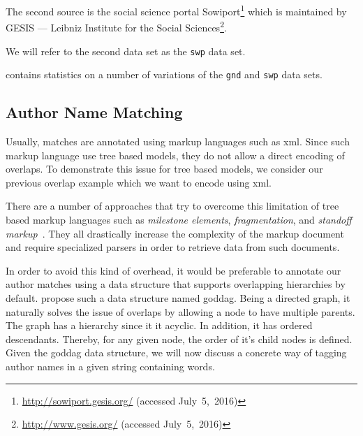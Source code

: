 \bigskip

The second source is the social science portal Sowiport\footnote{\url{http://sowiport.gesis.org/} (accessed July~5,~2016)} which is maintained by GESIS --- Leibniz Institute for the Social Sciences\footnote{\url{http://www.gesis.org/} (accessed July~5,~2016)}.

We will refer to the second data set as the \texttt{swp} data set.

\bigskip

 contains statistics on a number of variations of the \texttt{gnd} and  \texttt{swp} data sets.


\subsection{Author Name Matching}\label{subsec:i-author-name-matching}
Usually, matches are annotated using markup languages such as \gls{xml}.
Since such markup language use tree based models, they do not allow a direct encoding of overlaps.
To demonstrate this issue for tree based models, we consider our previous overlap example which we want to encode using \gls{xml}\@{}.

There are a number of approaches that try to overcome this limitation of tree based markup languages such as \textit{milestone elements}, \textit{fragmentation}, and \textit{standoff markup}~\citep{sperberg2000goddag}. They all drastically increase the complexity of the markup document and require specialized parsers in order to retrieve data from such documents.

In order to avoid this kind of overhead, it would be preferable to annotate our author matches using a data structure that supports overlapping hierarchies by default.
\citet{sperberg2000goddag} propose such a data structure named \acrfull{goddag}.
Being a directed graph, it naturally solves the issue of overlaps by allowing a node to have multiple parents.
The graph has a hierarchy since it it acyclic.
In addition, it has ordered descendants.
Thereby, for any given node, the order of it's child nodes is defined.
Given the \gls{goddag} data structure, we will now discuss a concrete way of tagging author names in a given string containing words.

